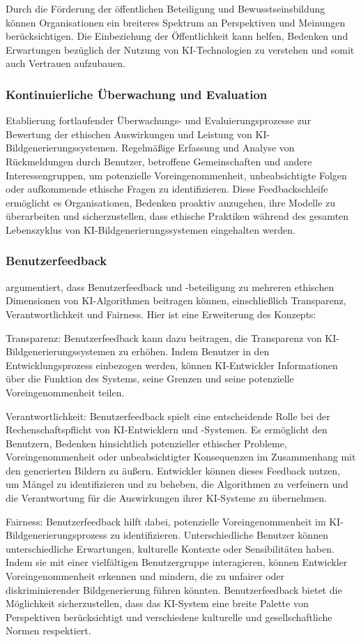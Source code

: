 \documentclass[12pt]{article}
\begin{document}
Durch die Förderung der öffentlichen Beteiligung und Bewusstseinsbildung können Organisationen ein breiteres Spektrum an Perspektiven und Meinungen berücksichtigen. Die Einbeziehung der Öffentlichkeit kann helfen, Bedenken und Erwartungen bezüglich der Nutzung von KI-Technologien zu verstehen und somit auch Vertrauen aufzubauen.
\cite{Zytko}
\subsubsection{Kontinuierliche Überwachung und Evaluation}
Etablierung fortlaufender Überwachungs- und Evaluierungsprozesse zur Bewertung der ethischen Auswirkungen und Leistung von KI-Bildgenerierungssystemen. Regelmäßige Erfassung und Analyse von Rückmeldungen durch Benutzer, betroffene Gemeinschaften und andere Interessengruppen, um potenzielle Voreingenommenheit, unbeabsichtigte Folgen oder aufkommende ethische Fragen zu identifizieren. Diese Feedbackschleife ermöglicht es Organisationen, Bedenken proaktiv anzugehen, ihre Modelle zu überarbeiten und sicherzustellen, dass ethische Praktiken während des gesamten Lebenszyklus von KI-Bildgenerierungssystemen eingehalten werden.
\cite{WILSON2022101652}
\subsubsection{Benutzerfeedback}
 \cite{Mittelstadt} argumentiert, dass Benutzerfeedback und -beteiligung zu mehreren ethischen Dimensionen von KI-Algorithmen beitragen können, einschließlich Transparenz, Verantwortlichkeit und Fairness. Hier ist eine Erweiterung des Konzepts:

Transparenz: Benutzerfeedback kann dazu beitragen, die Transparenz von KI-Bildgenerierungssystemen zu erhöhen. Indem Benutzer in den Entwicklungsprozess einbezogen werden, können KI-Entwickler Informationen über die Funktion des Systems, seine Grenzen und seine potenzielle Voreingenommenheit teilen.

Verantwortlichkeit: Benutzerfeedback spielt eine entscheidende Rolle bei der Rechenschaftspflicht von KI-Entwicklern und -Systemen. Es ermöglicht den Benutzern, Bedenken hinsichtlich potenzieller ethischer Probleme, Voreingenommenheit oder unbeabsichtigter Konsequenzen im Zusammenhang mit den generierten Bildern zu äußern. Entwickler können dieses Feedback nutzen, um Mängel zu identifizieren und zu beheben, die Algorithmen zu verfeinern und die Verantwortung für die Auswirkungen ihrer KI-Systeme zu übernehmen.

Fairness: Benutzerfeedback hilft dabei, potenzielle Voreingenommenheit im KI-Bildgenerierungsprozess zu identifizieren. Unterschiedliche Benutzer können unterschiedliche Erwartungen, kulturelle Kontexte oder Sensibilitäten haben. Indem sie mit einer vielfältigen Benutzergruppe interagieren, können Entwickler Voreingenommenheit erkennen und mindern, die zu unfairer oder diskriminierender Bildgenerierung führen könnten. Benutzerfeedback bietet die Möglichkeit sicherzustellen, dass das KI-System eine breite Palette von Perspektiven berücksichtigt und verschiedene kulturelle und gesellschaftliche Normen respektiert.
\end{document}
